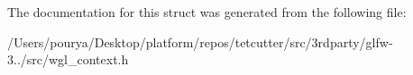 The documentation for this struct was generated from the following file\+:\begin{DoxyCompactItemize}
\item 
/\+Users/pourya/\+Desktop/platform/repos/tetcutter/src/3rdparty/glfw-\/3../src/wgl\+\_\+context.\+h\end{DoxyCompactItemize}
